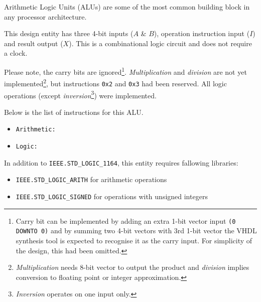 \documentclass[10pt,a4paper]{report}
\begin{document}
 Arithmetic Logic Units (ALUs) are some of
 the most common building block in any
 processor architecture.

 This design entity has three 4-bit inputs
 ($A$ \& $B$), operation instruction input
 ($I$) and result output ($X$). This is a
 combinational logic circuit and does not
 require a clock.

 Please note, the carry bits are ignored\footnote{
 Carry bit can be implemented by adding an extra
 1-bit vector input \texttt{(0 DOWNTO 0)} and by
 summing two 4-bit vectors with 3rd 1-bit vector
 the VHDL synthesis tool is expected to recognise
 it as the carry input. For simplicity of the
 design, this had been omitted.}.
 \emph{Multiplication} and \emph{division} are not
 yet implemented\footnote{\emph{Multiplication} needs
 8-bit vector to output the product and \emph{division}
 implies conversion to floating point or integer
 approximation.}, but instructions \texttt{0x2} and
 \texttt{0x3} had been reserved. All logic operations
 (except \emph{inversion}\footnote{\emph{Inversion}
 operates on one input only.}) were implemented.

 Below is the list of instructions for this ALU.
 \begin{itemize}
 \item \texttt{Arithmetic:}
 \item \texttt{Logic:}
 \end{itemize}

 In addition to \texttt{IEEE.STD\_LOGIC\_1164},
 this entity  requires fallowing libraries:
 \begin{itemize}
 \item \texttt{IEEE.STD\_LOGIC\_ARITH}
 for arithmetic operations
 \item \texttt{IEEE.STD\_LOGIC\_SIGNED}
 for operations with unsigned integers
 \end{itemize}
\end{document}
